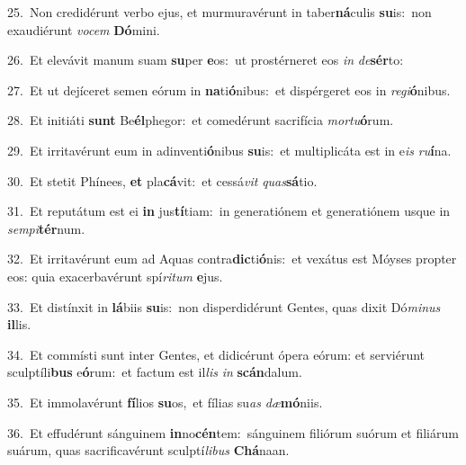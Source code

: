 {\numbfont\textcolor{\numbcolor}{25.}}~Non credidérunt verbo ejus, et murmuravérunt in taber\-\textbf{ná}\-culis \textbf{su}\-is:~\star non exaudiérunt \textit{vo}\-\textit{cem} \textbf{Dó}\-mini.\par
{\numbfont\textcolor{\numbcolor}{26.}}~Et elevávit manum suam \textbf{su}\-per \textbf{e}\-os:~\star ut prostérneret eos \textit{in} \textit{de}\-\textbf{sér}to:\par
{\numbfont\textcolor{\numbcolor}{27.}}~Et ut dejíceret semen eórum in \textbf{na}\-ti\-\textbf{ó}\-nibus:~\star et dispérgeret eos in \textit{re}\-\textit{gi}\textbf{ó}nibus.\par
{\numbfont\textcolor{\numbcolor}{28.}}~Et initiáti \textbf{sunt} Be\-\textbf{él}\-phegor:~\star et comedérunt sacrifícia \textit{mor}\-\textit{tu}\textbf{ó}rum.\par
{\numbfont\textcolor{\numbcolor}{29.}}~Et irritavérunt eum in adinventi\-\textbf{ó}\-nibus \textbf{su}\-is:~\star et multiplicáta est in e\textit{is} \textit{ru}\-\textbf{í}na.\par
{\numbfont\textcolor{\numbcolor}{30.}}~Et stetit Phínees, \textbf{et} pla\-\textbf{cá}\-vit:~\star et cessá\textit{vit} \textit{quas}\-\textbf{sá}tio.\par
{\numbfont\textcolor{\numbcolor}{31.}}~Et reputátum est ei \textbf{in} jus\-\textbf{tí}\-tiam:~\star in generatiónem et generatiónem usque in \textit{sem}\-\textit{pi}\textbf{tér}num.\par
{\numbfont\textcolor{\numbcolor}{32.}}~Et irritavérunt eum ad Aquas contra\-\textbf{dic}\-ti\-\textbf{ó}\-nis:~\star et vexátus est Móyses propter eos: quia exacerbavérunt spí\-\textit{ri}\-\textit{tum} \textbf{e}\-jus.\par
{\numbfont\textcolor{\numbcolor}{33.}}~Et distínxit in \textbf{lá}\-biis \textbf{su}\-is:~\star non disperdidérunt Gentes, quas dixit Dó\-\textit{mi}\-\textit{nus} \textbf{il}\-lis.\par
{\numbfont\textcolor{\numbcolor}{34.}}~Et commísti sunt inter Gentes, et didicérunt ópera eórum: et serviérunt sculptíli\textbf{bus} e\-\textbf{ó}\-rum:~\star et factum est il\textit{lis} \textit{in} \textbf{scán}\-dalum.\par
{\numbfont\textcolor{\numbcolor}{35.}}~Et immolavérunt \textbf{fí}\-lios \textbf{su}\-os,~\star et fílias su\textit{as} \textit{dæ}\-\textbf{mó}niis.\par
{\numbfont\textcolor{\numbcolor}{36.}}~Et effudérunt sánguinem \textbf{in}\-no\-\textbf{cén}\-tem:~\star sánguinem filiórum suórum et filiárum suárum, quas sacrificavérunt sculptí\-\textit{li}\-\textit{bus} \textbf{Chá}\-naan.\par
